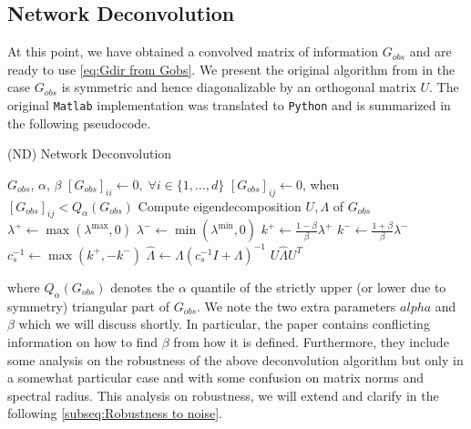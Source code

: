 \documentclass[../Thesis.tex]{subfiles}
\begin{document}
\subsection{Network Deconvolution}
At this point, we have obtained a convolved matrix of information $G_{obs}$ and are ready to use \autoref{eq:Gdir from Gobs}. We present the original algorithm from \cite{Network-deconvolution-as-a-general-method-to-distinguish-direct-dependencies-in-networks} in the case $G_{obs}$ is symmetric and hence diagonalizable by an orthogonal matrix $U$. The original \texttt{Matlab} implementation was translated to \texttt{Python} and is summarized in the following pseudocode.
\begin{algorithm}[H]
    \caption{(ND) Network Deconvolution}\label{alg:ND}
    \begin{algorithmic}
        \Require $G_{obs}$, $\alpha$, $\beta$             %
        \State $\left[G_{obs}\right]_{ii} \gets 0, \; \forall i\in \{1,\dots, d\}$                    
        \State $\left[G_{obs}\right]_{ij} \gets 0$, when $\left[G_{obs}\right]_{ij} < Q_{\alpha}\left(G_{obs}\right)$
        \State Compute eigendecomposition $U,\Lambda$ of $G_{obs}$
        \State $\lambda^+ \gets  \max{ \left( \lambda^{\text{max}},0 \right) }$
        \State $\lambda^- \gets \min{ \left( \lambda^{\text{min}},0 \right) }$
        \State $k^+ \gets \frac{1-\beta}{\beta} \lambda^+$
        \State $k^- \gets \frac{1+\beta}{\beta} \lambda^-$
        \State $c_s^{-1} \gets \max{\left( k^+, - k^- \right)}$
        \State $\hat{\Lambda} \gets \Lambda \left(c_s^{-1}I + \Lambda\right)^{-1}$
        \State \Return $U \hat{\Lambda} U^T$
    \end{algorithmic}
\end{algorithm}
where $Q_{\alpha} \left(G_{obs}\right)$ denotes the $\alpha$ quantile of the strictly upper (or lower due to symmetry) triangular part of $G_{obs}$. We note the two extra parameters $alpha$ and $\beta$ which we will discuss shortly. In particular, the paper contains conflicting information on how to find $\beta$ from how it is defined. Furthermore, they include some analysis on the robustness of the above deconvolution algorithm but only in a somewhat particular case and with some confusion on matrix norms and spectral radius. This analysis on robustness, we will extend and clarify in the following \autoref{subseq:Robustness to noise}.
\end{document}
